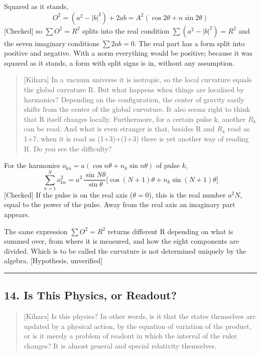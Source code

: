 \documentclass[
  a4paper,
]{article}
\begin{document}
Squared as it stands, \[
O^2 = (a^2 - \lvert b\rvert^2) + 2ab = A^2(\cos2\theta + n\sin2\theta) \tag{13.2}
\] {[}Checked{]} so \(\sum O^2 = R^2\) splits into the real condition
\(\sum(a^2 - \lvert b\rvert^2) = R^2\) and the seven imaginary
conditions \(\sum 2ab = 0\). The real part has a form split into
positive and negative. With a norm everything would be positive; because
it was squared as it stands, a form with split signs is in, without any
assumption.

\begin{quote}
{[}Kihara{]} In a vacuum universe it is isotropic, so the local
curvature equals the global curvature R. But what happens when things
are localized by harmonics? Depending on the configuration, the center
of gravity easily shifts from the center of the global curvature. It
also seems right to think that R itself changes locally. Furthermore,
for a certain pulse k, another \(R_k\) can be read. And what is even
stranger is that, besides R and \(R_k\) read as 1+7, when it is read as
(1+3)+(1+3) there is yet another way of reading R. Do you see the
difficulty?
\end{quote}

For the harmonics \(o_{kn} = a(\cos n\theta + n_k\sin n\theta)\) of
pulse \(k\), \[
\sum_{n=1}^N o_{kn}^2 = a^2\,\frac{\sin N\theta}{\sin\theta}\big[\cos(N+1)\theta + n_k\sin(N+1)\theta\big] \tag{13.3}
\] {[}Checked{]} If the pulse is on the real axis (\(\theta = 0\)), this
is the real number \(a^2N\), equal to the power of the pulse. Away from
the real axis an imaginary part appears.

The same expression \(\sum O^2 = R^2\) returns different R depending on
what is summed over, from where it is measured, and how the eight
components are divided. Which is to be called the curvature is not
determined uniquely by the algebra. {[}Hypothesis, unverified{]}

\begin{center}\rule{0.5\linewidth}{0.5pt}\end{center}

\subsection{14. Is This Physics, or
Readout?}\label{is-this-physics-or-readout}

\begin{quote}
{[}Kihara{]} Is this physics? In other words, is it that the states
themselves are updated by a physical action, by the equation of
variation of the product, or is it merely a problem of readout in which
the interval of the ruler changes? It is almost general and special
relativity themselves.
\end{quote}
\end{document}
